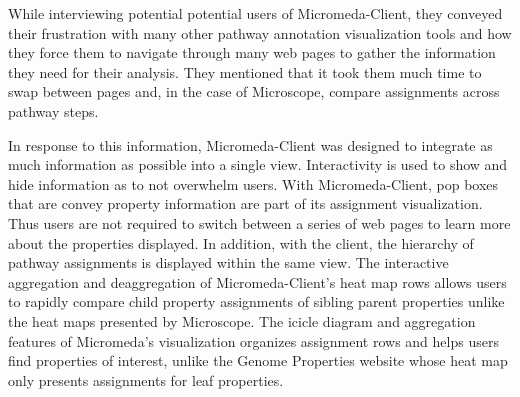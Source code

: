 While interviewing potential potential users of Micromeda-Client, they conveyed their frustration with many other pathway annotation visualization tools and how they force them to navigate through many web pages to gather the information they need for their analysis. They mentioned that it took them much time to swap between pages and, in the case of Microscope, compare assignments across pathway steps. 

In response to this information, Micromeda-Client was designed to integrate as much information as possible into a single view. Interactivity is used to show and hide information as to not overwhelm users. With Micromeda-Client, pop boxes that are convey property information are part of its assignment visualization. Thus users are not required to switch between a series of web pages to learn more about the properties displayed. In addition, with the client, the hierarchy of pathway assignments is displayed within the same view.  The interactive aggregation and deaggregation of Micromeda-Client's heat map rows allows users to rapidly compare child property assignments of sibling parent properties unlike the heat maps presented by Microscope. The icicle diagram and aggregation features of Micromeda's visualization organizes assignment rows and helps users find properties of interest, unlike the Genome Properties website whose heat map only presents assignments for leaf properties.

